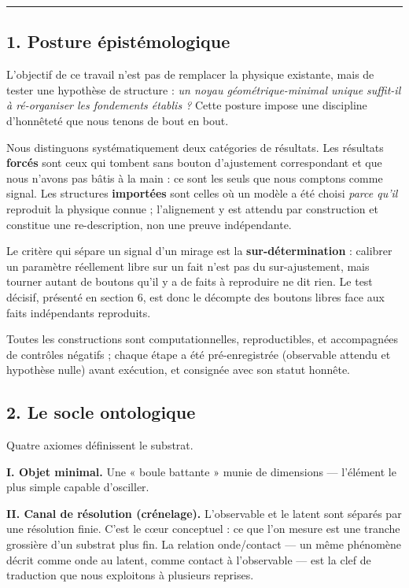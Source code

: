 \documentclass[11pt]{article}
\begin{document}
\begin{center}\rule{0.5\linewidth}{0.5pt}\end{center}

\hypertarget{posture-uxe9pistuxe9mologique}{%
\subsection{1. Posture
épistémologique}\label{posture-uxe9pistuxe9mologique}}

L'objectif de ce travail n'est pas de remplacer la physique existante,
mais de tester une hypothèse de structure : \emph{un noyau
géométrique-minimal unique suffit-il à ré-organiser les fondements
établis ?} Cette posture impose une discipline d'honnêteté que nous
tenons de bout en bout.

Nous distinguons systématiquement deux catégories de résultats. Les
résultats \textbf{forcés} sont ceux qui tombent sans bouton d'ajustement
correspondant et que nous n'avons pas bâtis à la main : ce sont les
seuls que nous comptons comme signal. Les structures \textbf{importées}
sont celles où un modèle a été choisi \emph{parce qu'il} reproduit la
physique connue ; l'alignement y est attendu par construction et
constitue une re-description, non une preuve indépendante.

Le critère qui sépare un signal d'un mirage est la
\textbf{sur-détermination} : calibrer un paramètre réellement libre sur
un fait n'est pas du sur-ajustement, mais tourner autant de boutons
qu'il y a de faits à reproduire ne dit rien. Le test décisif, présenté
en section 6, est donc le décompte des boutons libres face aux faits
indépendants reproduits.

Toutes les constructions sont computationnelles, reproductibles, et
accompagnées de contrôles négatifs ; chaque étape a été pré-enregistrée
(observable attendu et hypothèse nulle) avant exécution, et consignée
avec son statut honnête.

\hypertarget{le-socle-ontologique}{%
\subsection{2. Le socle ontologique}\label{le-socle-ontologique}}

Quatre axiomes définissent le substrat.

\textbf{I. Objet minimal.} Une « boule battante » munie de dimensions
--- l'élément le plus simple capable d'osciller.

\textbf{II. Canal de résolution (crénelage).} L'observable et le latent
sont séparés par une résolution finie. C'est le cœur conceptuel : ce que
l'on mesure est une tranche grossière d'un substrat plus fin. La
relation onde/contact --- un même phénomène décrit comme onde au latent,
comme contact à l'observable --- est la clef de traduction que nous
exploitons à plusieurs reprises.
\end{document}
